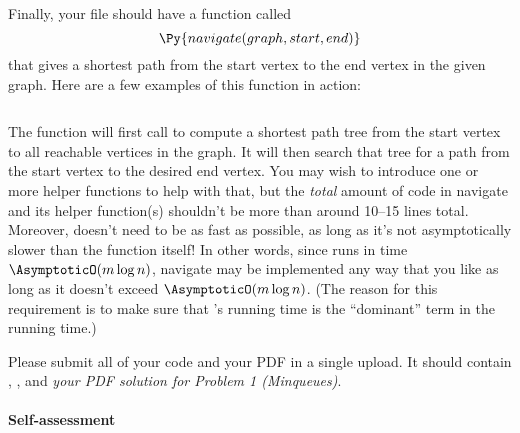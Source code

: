 \documentclass{ks-pset}
\begin{document}
\begin{problem}[\Py{PrimDijkstra}, 65]
\begin{description}
\begin{description}
\begin{note}
            \inputminted{python}{template/02-pd-difference.py}
          \end{note}

        \item[\Py{navigate(graph, start, end)}] Finally, your
           file should have a function called
          \[
            \Py{navigate(graph, start, end)}
          \]
          that gives a shortest path from the start vertex to the end vertex in
          the given graph. Here are a few examples of this function in action:

          \inputminted{python}{template/02-navigate.py}

          The  function will first call  to
          compute a shortest path tree from the start vertex to all reachable
          vertices in the graph.  It will then search that tree for a path from
          the start vertex to the desired end vertex.  You may wish to
          introduce one or more helper functions to help with that, but the
          \emph{total} amount of code in navigate and its helper function(s)
          shouldn't be more than around 10--15 lines total.  Moreover,
           doesn't need to be as fast as possible, as long as it's
          not asymptotically slower than the  function itself!
          In other words, since  runs in time $\AsymptoticO(m
          \log n)$, navigate may be implemented any way that you like as long
          as it doesn't exceed $\AsymptoticO(m \log n)$. (The reason for this
          requirement is to make sure that 's running time
          is the ``dominant'' term in the running time.)

      \end{description}
  \end{description}

  Please submit all of your code and your PDF in a single upload. It should
  contain , , and \emph{your PDF solution
  for Problem 1 (Minqueues)}.

\end{problem}

\begin{solution}

  \paragraph{Self-assessment}
\end{solution}
\end{document}
